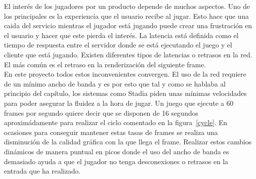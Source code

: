 El inter\'es de los jugadores por un producto depende de muchos aspectos. Uno de los principales es la experiencia que el usuario recibe al jugar. Esto hace que una caida del servicio mientras el jugador est\'a jugando puede crear una frustraci\'on en el usuario y hacer que este pierda el inter\'es. La latencia est\'a definida como el tiempo de respuesta entre el servidor donde se est\'a ejecutando el juego y el cliente que est\'a jugando. Existen diferentes tipos de latencias o retrasos en la red. El m\'as com\'un es el retraso en la renderizaci\'on del siguiente frame. \\

En este proyecto todos estos inconvenientes convergen. El uso de la red requiere de un m\'inimo ancho de banda y es por esto que tal y como se hablaba al principio del cap\'itulo, los sistemas como Stadia piden unas m\'inimas velocidades para poder asegurar la fluidez a la hora de jugar. Un juego que ejecute a 60 frames por segundo quiere decir que se disponen de 16 segundos aproxim\'adamente para realizar el ciclo comentado en la figura~\ref{cycle}. En ocasiones para conseguir mantener estas tasas de frames se realiza una disminuci\'on de la calidad gr\'afica con la que llega el frame. Realizar estos cambios din\'amicos de manera puntual en picos donde el uso del ancho de banda es demasiado ayuda a que el jugador no tenga desconexiones o retrasos en la entrada que ha realizado.\\




